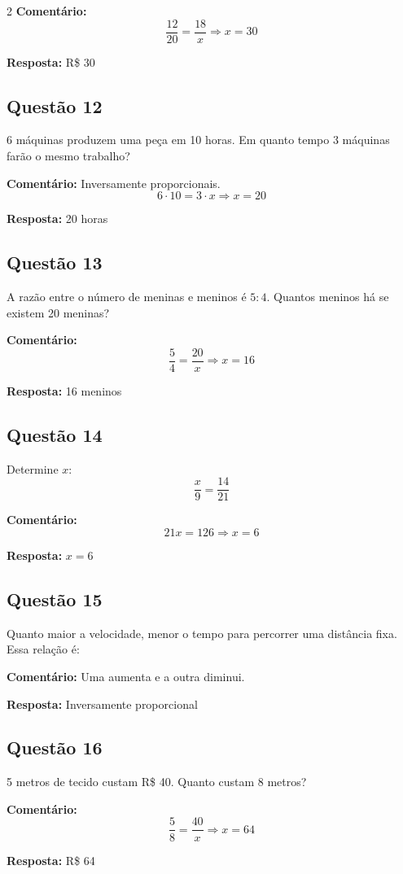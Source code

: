 \documentclass[11pt]{article}
\begin{document}
\begin{multicols}{2}
\textbf{Comentário:}
\[
\frac{12}{20} = \frac{18}{x} \Rightarrow x = 30
\]

\textbf{Resposta:} R\$ 30

\subsection*{Questão 12}
6 máquinas produzem uma peça em 10 horas. Em quanto tempo 3 máquinas farão o mesmo trabalho?

\textbf{Comentário:} Inversamente proporcionais.
\[
6 \cdot 10 = 3 \cdot x \Rightarrow x = 20
\]

\textbf{Resposta:} 20 horas

\subsection*{Questão 13}
A razão entre o número de meninas e meninos é $5:4$. Quantos meninos há se existem 20 meninas?

\textbf{Comentário:}
\[
\frac{5}{4} = \frac{20}{x} \Rightarrow x = 16
\]

\textbf{Resposta:} 16 meninos

\subsection*{Questão 14}
Determine $x$:
\[
\frac{x}{9} = \frac{14}{21}
\]

\textbf{Comentário:}
\[
21x = 126 \Rightarrow x = 6
\]

\textbf{Resposta:} $x = 6$

\subsection*{Questão 15}
Quanto maior a velocidade, menor o tempo para percorrer uma distância fixa. Essa relação é:

\textbf{Comentário:} Uma aumenta e a outra diminui.

\textbf{Resposta:} Inversamente proporcional

\subsection*{Questão 16}
5 metros de tecido custam R\$ 40. Quanto custam 8 metros?

\textbf{Comentário:}
\[
\frac{5}{8} = \frac{40}{x} \Rightarrow x = 64
\]

\textbf{Resposta:} R\$ 64


\end{multicols}
\end{document}
